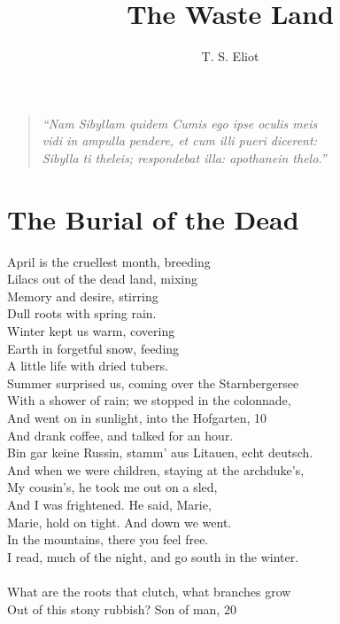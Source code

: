 \documentclass{article}
\title{The Waste Land}
\author{T. S. Eliot}
\date{}
\begin{document}
\maketitle
\begin{quote}
\itshape
``Nam Sibyllam quidem Cumis ego ipse oculis meis \\
vidi in ampulla pendere, et cum illi pueri dicerent: \\
Sibylla ti theleis; respondebat illa: apothanein thelo.''
\end{quote}
\upshape

\section{The Burial of the Dead}

April is the cruellest month, breeding \\
Lilacs out of the dead land, mixing \\
Memory and desire, stirring \\
Dull roots with spring rain. \\
Winter kept us warm, covering \\
Earth in forgetful snow, feeding \\
A little life with dried tubers. \\
Summer surprised us, coming over the Starnbergersee \\
With a shower of rain; we stopped in the colonnade, \\
And went on in sunlight, into the Hofgarten,                     \hfill 10 \\
And drank coffee, and talked for an hour. \\
Bin gar keine Russin, stamm' aus Litauen, echt deutsch. \\
And when we were children, staying at the archduke's, \\
My cousin's, he took me out on a sled, \\
And I was frightened. He said, Marie, \\
Marie, hold on tight. And down we went. \\
In the mountains, there you feel free. \\
I read, much of the night, and go south in the winter. \\
 \\
What are the roots that clutch, what branches grow \\
Out of this stony rubbish? Son of man,                            \hfill 20 \\
\end{document}
